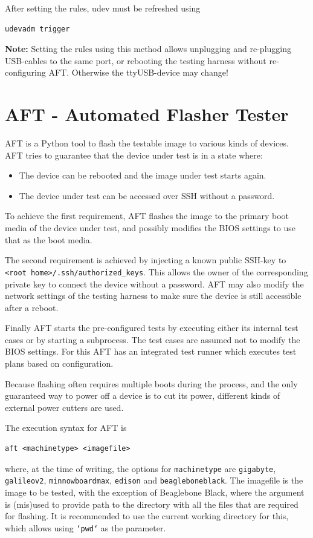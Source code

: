 \documentclass[a4paper,11pt]{article}
\newcommand{\note}{\textbf{Note: }}
\newcommand{\cmd}[1]{\texttt{#1}}
\begin{document}
After setting the rules, udev must be refreshed using
\begin{lstlisting}
udevadm trigger
\end{lstlisting}

\note Setting the rules using this method allows unplugging and re-plugging USB-cables to the same port, or rebooting the testing harness without re-configuring AFT. Otherwise the ttyUSB-device may change!

\section{AFT - Automated Flasher Tester}
\label{aft}

AFT is a Python tool to flash the testable image to various kinds of devices.  AFT tries to guarantee that the device under test is in a state where:
\begin{itemize}
\item The device can be rebooted and the image under test starts again.
\item The device under test can be accessed over SSH without a password.
\end{itemize}

To achieve the first requirement, AFT flashes the image to the primary boot media of the device under test, and possibly modifies the BIOS settings to use that as the boot media.

The second requirement is achieved by injecting a known public SSH-key to \linebreak\cmd{<root home>/.ssh/authorized\_keys}. This allows the owner of the corresponding private key to connect the device without a password. AFT may also modify the network settings of the testing harness to make sure the device is still accessible after a reboot.

Finally AFT starts the pre-configured tests by executing either its internal test cases or by starting a subprocess. The test cases are assumed not to modify the BIOS settings. For this AFT has an integrated test runner which executes test plans based on configuration.

Because flashing often requires multiple boots during the process, and the only guaranteed way to power off a device is to cut its power, different kinds of external power cutters are used.

The execution syntax for AFT is
\begin{lstlisting}
aft <machinetype> <imagefile>
\end{lstlisting}
where, at the time of writing, the options for  \cmd{machinetype} are \cmd{gigabyte}, \cmd{galileov2}, \cmd{minnowboardmax}, \cmd{edison} and \cmd{beagleboneblack}. The imagefile is the image to be tested, with the exception of Beaglebone Black, where the argument is (mis)used to provide path to the directory with all the files that are required for flashing. It is recommended to use the current working directory for this, which allows using \cmd{`pwd`} as the parameter.
\end{document}
